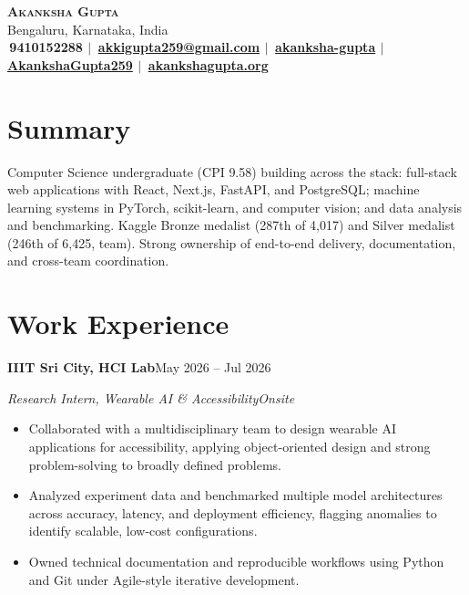 \documentclass[11pt,letterpaper]{article}
\newcommand{\org}[2]{%
  \vspace{1pt}\noindent\textbf{#1}\hfill {\small #2}\par\nopagebreak%
}
\newcommand{\role}[2]{%
  \noindent\textit{#1}\hfill\textit{\small #2}\par\nopagebreak\vspace{1pt}%
}
\begin{document}
\begin{center}
  {\fontsize{30}{34}\selectfont\scshape\bfseries Akanksha Gupta}\\[6pt]
  {\normalsize Bengaluru, Karnataka, India}\\[7pt]
  {\large\bfseries
    \faPhone\,9410152288 \hspace{4pt}$|$\hspace{4pt}
    \faEnvelope\,\href{mailto:akkigupta259@gmail.com}{akkigupta259@gmail.com} \hspace{4pt}$|$\hspace{4pt}
    \faLinkedin\,\href{https://linkedin.com/in/akanksha-gupta-a9241028b}{akanksha-gupta} \hspace{4pt}$|$\hspace{4pt}
    \faGithub\,\href{https://github.com/AkankshaGupta259}{AkankshaGupta259} \hspace{4pt}$|$\hspace{4pt}
    \faGlobe\,\href{https://akankshagupta.org}{akankshagupta.org}
  }
\end{center}

\section*{Summary}
Computer Science undergraduate (CPI 9.58) building across the stack: full-stack web
applications with React, Next.js, FastAPI, and PostgreSQL; machine learning systems in
PyTorch, scikit-learn, and computer vision; and data analysis and benchmarking. Kaggle
Bronze medalist (287th of 4,017) and Silver medalist (246th of 6,425, team). Strong
ownership of end-to-end delivery, documentation, and cross-team coordination.

\section*{Work Experience}

\org{IIIT Sri City, HCI Lab}{May 2026 -- Jul 2026}
\role{Research Intern, Wearable AI \& Accessibility}{Onsite}
\begin{itemize}
  \item Collaborated with a multidisciplinary team to design wearable AI applications for accessibility, applying object-oriented design and strong problem-solving to broadly defined problems.
  \item Analyzed experiment data and benchmarked multiple model architectures across accuracy, latency, and deployment efficiency, flagging anomalies to identify scalable, low-cost configurations.
  \item Owned technical documentation and reproducible workflows using Python and Git under Agile-style iterative development.
\end{itemize}
\end{document}

